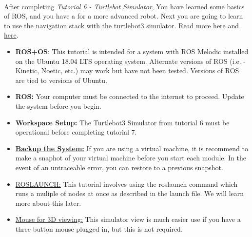\documentclass[12pt]{article}
\begin{document}
\begin{description}[labelindent=1cm]
	
	\item[\textbf{\underline{Overview:}}] \hfill \vspace{3mm}\\
	After completing {\it Tutorial 6 - Turtlebot Simulator}, You have learned some basics of ROS, and you have a for a more advanced robot. Next you are going to learn to use the navigation stack with the turtlebot3 simulator. Read more \href{https://emanual.robotis.com/docs/en/platform/turtlebot3/navigation/#ros-1-navigation}{here} and \href{http://wiki.ros.org/navigation/Tutorials}{here}.
	
	\item[\textbf{\underline{System Requirements:}}] \hfill \vspace{0mm}

\begin{itemize}
	\item {\bf ROS+OS}: This tutorial is intended for a system with ROS Melodic installed on the Ubuntu 18.04 LTS operating system. Alternate versions of ROS (i.e. - Kinetic, Noetic, etc.) may work but have not been tested. Versions of ROS are tied to versions of Ubuntu.
	\item {\bf ROS:} Your computer must be connected to the internet to proceed. Update the system before you begin.
	\item {\bf Workspace Setup:} The Turtlebot3 Simulator from tutorial 6 must be operational before completing tutorial 7.  
\end{itemize}

	
	\item[\textbf{\underline{Disclaimer:}}] \hfill \vspace{0mm}
	
	\begin{itemize}

		\item {\R\underline{\bf Backup the System:}} If you are using a virtual machine, it is recommend to make a snaphot of your virtual machine before you start each module. In the event of an untraceable error, you can restore to a previous snapshot. 
		
		\item \underline{\B ROSLAUNCH:} This tutorial involves using the roslaunch command which runs a muliple of nodes at once as described in the launch file. We will learn more about this later. 
	
		\item \underline{\G Mouse for 3D viewing:} This simulator view is much easier use if you have a three button mouse plugged in, but this is not required.
	

\end{itemize}
\end{description}
\end{document}
